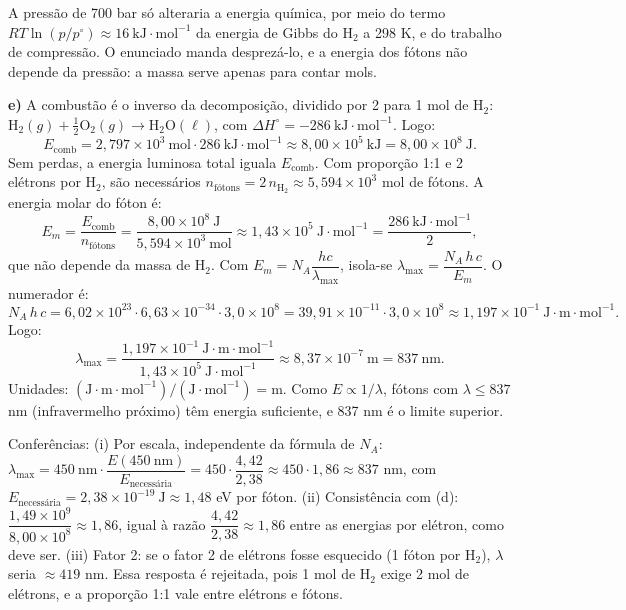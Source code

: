 \documentclass{article}%
\begin{document}
A pressão de 700 bar só alteraria a energia química, por meio do termo $RT\ln(p/p^{\circ})\approx 16\ \text{kJ}\cdot\text{mol}^{-1}$ da energia de Gibbs do $\text{H}_2$ a 298 K, e do trabalho de compressão. O enunciado manda desprezá-lo, e a energia dos fótons não depende da pressão: a massa serve apenas para contar mols.

\textbf{e)} A combustão é o inverso da decomposição, dividido por 2 para 1 mol de $\text{H}_2$: $\text{H}_2(g)+\tfrac{1}{2}\text{O}_2(g)\rightarrow\text{H}_2\text{O}(\ell)$, com $\Delta H^{\circ}=-286\ \text{kJ}\cdot\text{mol}^{-1}$. Logo:
\[
E_{\text{comb}}=2{,}797\times10^{3}\ \text{mol}\cdot 286\ \text{kJ}\cdot\text{mol}^{-1}\approx 8{,}00\times10^{5}\ \text{kJ}=8{,}00\times10^{8}\ \text{J}.
\]
Sem perdas, a energia luminosa total iguala $E_{\text{comb}}$. Com proporção 1:1 e 2 elétrons por $\text{H}_2$, são necessários $n_{\text{fótons}}=2\,n_{\text{H}_2}\approx 5{,}594\times10^{3}$ mol de fótons. A energia molar do fóton é:
\[
E_m=\frac{E_{\text{comb}}}{n_{\text{fótons}}}=\frac{8{,}00\times10^{8}\ \text{J}}{5{,}594\times10^{3}\ \text{mol}}\approx 1{,}43\times10^{5}\ \text{J}\cdot\text{mol}^{-1}=\frac{286\ \text{kJ}\cdot\text{mol}^{-1}}{2},
\]
que não depende da massa de $\text{H}_2$. Com $E_m=N_A\dfrac{hc}{\lambda_{\max}}$, isola-se $\lambda_{\max}=\dfrac{N_A\,h\,c}{E_m}$. O numerador é:
\[
N_A\,h\,c=6{,}02\times10^{23}\cdot 6{,}63\times10^{-34}\cdot 3{,}0\times10^{8}=39{,}91\times10^{-11}\cdot 3{,}0\times10^{8}\approx 1{,}197\times10^{-1}\ \text{J}\cdot\text{m}\cdot\text{mol}^{-1}.
\]
Logo:
\[
\lambda_{\max}=\frac{1{,}197\times10^{-1}\ \text{J}\cdot\text{m}\cdot\text{mol}^{-1}}{1{,}43\times10^{5}\ \text{J}\cdot\text{mol}^{-1}}\approx 8{,}37\times10^{-7}\ \text{m}=837\ \text{nm}.
\]
Unidades: $(\text{J}\cdot\text{m}\cdot\text{mol}^{-1})/(\text{J}\cdot\text{mol}^{-1})=\text{m}$. Como $E\propto 1/\lambda$, fótons com $\lambda\le 837$ nm (infravermelho próximo) têm energia suficiente, e 837 nm é o limite superior.

Conferências:
(i) Por escala, independente da fórmula de $N_A$: $\lambda_{\max}=450\ \text{nm}\cdot\dfrac{E(450\ \text{nm})}{E_{\text{necessária}}}=450\cdot\dfrac{4{,}42}{2{,}38}\approx 450\cdot 1{,}86\approx 837$ nm, com $E_{\text{necessária}}=2{,}38\times10^{-19}\ \text{J}\approx 1{,}48$ eV por fóton.
(ii) Consistência com (d): $\dfrac{1{,}49\times10^{9}}{8{,}00\times10^{8}}\approx 1{,}86$, igual à razão $\dfrac{4{,}42}{2{,}38}\approx 1{,}86$ entre as energias por elétron, como deve ser.
(iii) Fator 2: se o fator 2 de elétrons fosse esquecido (1 fóton por $\text{H}_2$), $\lambda$ seria $\approx 419$ nm. Essa resposta é rejeitada, pois 1 mol de $\text{H}_2$ exige 2 mol de elétrons, e a proporção 1:1 vale entre elétrons e fótons.
\end{document}
